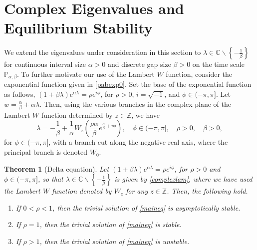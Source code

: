 \documentclass[12pt,reqno]{amsart}
\theoremstyle{plain}
\newtheorem{theorem}{Theorem}
\theoremstyle{definition}
\newcommand{\Z}{\ensuremath{\mathbb{Z}}}
\newcommand{\C}{\ensuremath{\mathbb{C}}}
\newcommand{\p}{\ensuremath{\mathbb{P}}}
\numberwithin{equation}{section}
\numberwithin{theorem}{section}
\begin{document}

\section{Complex Eigenvalues and Equilibrium Stability}

We extend the eigenvalues under consideration in this section to $\lambda\in\C\backslash\left\{-\frac{1}{\beta}\right\}$ for continuous interval size $\alpha>0$ and discrete gap size $\beta>0$ on the time scale $\p_{\alpha,\beta}$. To further motivate our use of the Lambert $W$ function, consider the exponential function given in \eqref{pabexp0}. Set the base of the exponential function as follows, $(1+\beta\lambda)e^{\alpha\lambda}=\rho e^{i\phi}$, for $\rho >0$, $i=\sqrt{-1}$, and $\phi\in(-\pi,\pi]$. Let $w=\frac{\alpha}{\beta}+\alpha\lambda$. Then, using the various branches in the complex plane of the Lambert $W$ function determined by $z\in\Z$, 
we have
\begin{equation}\label{complexlam}
 \lambda = -\frac{1}{\beta}+\frac{1}{\alpha}W_z\left(\frac{\rho \alpha}{\beta}e^{\frac{\alpha}{\beta}+i\phi}\right), \quad \phi\in(-\pi,\pi], \quad \rho >0, \quad \beta>0,
\end{equation} 
for $\phi\in(-\pi,\pi]$, with a branch cut along the negative real axis, where the principal branch is denoted $W_0$. 


\begin{theorem}[Delta equation]\label{complexTHM}
Let $(1+\beta\lambda)e^{\alpha\lambda}=\rho e^{i\phi}$, for $\rho >0$ and $\phi\in(-\pi,\pi]$, so that $\lambda\in\C\backslash\left\{-\frac{1}{\beta}\right\}$ is given by \eqref{complexlam}, where we have used the Lambert $W$ function denoted by $W_z$ for any $z\in\Z$. Then, the following hold.
\begin{enumerate}
\item[(a)] If $0<\rho<1$, then the trivial solution of \eqref{maineq} is asymptotically stable.
\item[(b)] If $\rho =1$, then the trivial solution of \eqref{maineq} is stable.
\item[(c)] If $\rho>1$, then the trivial solution of \eqref{maineq} is unstable.
\end{enumerate}
\end{theorem}
\end{document}
